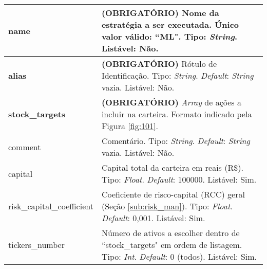 \begin{center}
{\begin{longtable}[m]{| m{11em} | m{21em} |}
        \hline
        \textbf{name} & \textbf{(OBRIGATÓRIO)} Nome da estratégia a ser executada. Único valor válido: ``ML". Tipo: \textit{String}. Listável: Não. \\
        \hline
        \textbf{alias} & \textbf{(OBRIGATÓRIO)} Rótulo de Identificação. Tipo: \textit{String}. \textit{Default}: \textit{String} vazia. Listável: Não. \\
        \hline
        \textbf{stock\_targets} & \textbf{(OBRIGATÓRIO)} \textit{Array} de ações a incluir na carteira. Formato indicado pela Figura \ref{fig:101}. \\
        \hline
        comment & Comentário. Tipo: \textit{String}. \textit{Default}: \textit{String} vazia. Listável: Não. \\
        \hline
        capital & Capital total da carteira em reais (R\$). Tipo: \textit{Float}. \textit{Default}: 100000. Listável: Sim. \\
        \hline
        risk\_capital\_coefficient & Coeficiente de risco-capital (RCC) geral (Seção \ref{sub:risk_man}). Tipo: \textit{Float}. \textit{Default}: 0,001. Listável: Sim. \\
        \hline
        tickers\_number & Número de ativos a escolher dentro de ``stock\_targets" em ordem de listagem. Tipo: \textit{Int}. \textit{Default}: 0 (todos). Listável: Sim. \\

\end{longtable}}
\end{center}
